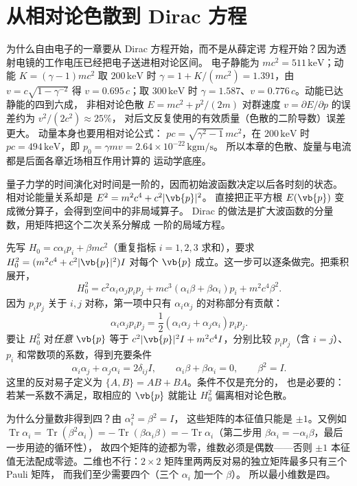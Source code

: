 \section{从相对论色散到 Dirac 方程}
\label{sec:feqo-dirac-from-dispersion}

为什么自由电子的一章要从 Dirac 方程开始，而不是从薛定谔
方程开始？因为透射电镜的工作电压已经把电子送进相对论区间。
电子静能为 \(mc^2=511\,\si{\kilo\electronvolt}\)；动能
\(K=(\gamma-1)mc^2\) 取 \(200\,\si{\kilo\electronvolt}\) 时
\(\gamma=1+K/(mc^2)=1.391\)，由 \(v=c\sqrt{1-\gamma^{-2}}\)
得 \(v=0.695\,c\)；取 \(300\,\si{\kilo\electronvolt}\) 时
\(\gamma=1.587\)、\(v=0.776\,c\)。动能已达静能的四到六成，
非相对论色散 \(E=mc^2+p^2/(2m)\) 对群速度
\(v=\partial E/\partial p\) 的误差约为 \(v^2/(2c^2)\approx25\%\)，
对后文反复使用的有效质量（色散的二阶导数）误差更大。
动量本身也要用相对论公式：
\(pc=\sqrt{\gamma^2-1}\,mc^2\)，在 \(200\,\si{\kilo\electronvolt}\)
时 \(pc=494\,\si{\kilo\electronvolt}\)，即
\(p_0=\gamma mv=2.64\times10^{-22}\,\si{\kilo\gram\metre\per\second}\)。
所以本章的色散、旋量与电流都是后面各章近场相互作用计算的
运动学底座。

量子力学的时间演化对时间是一阶的，因而初始波函数决定以后各时刻的状态。
相对论能量关系却是 \(E^2=m^2c^4+c^2|\vb{p}|^2\)。
直接把正平方根 \(E(\vb{p})\) 变成微分算子，会得到空间中的非局域算子。
Dirac 的做法是扩大波函数的分量数，用矩阵把这个二次关系分解成
一阶的局域方程。

先写 \(H_0=c\alpha_i p_i+\beta mc^2\)（重复指标 \(i=1,2,3\) 求和），要求
\(H_0^2=(m^2c^4+c^2|\vb{p}|^2)I\) 对每个 \(\vb{p}\)
成立。这一步可以逐条做完。把乘积展开，
\[
H_0^2=c^2\alpha_i\alpha_jp_ip_j
+mc^3(\alpha_i\beta+\beta\alpha_i)p_i+m^2c^4\beta^2 .
\]
因为 \(p_ip_j\) 关于 \(i,j\) 对称，第一项中只有 \(\alpha_i\alpha_j\)
的对称部分有贡献：
\[
\alpha_i\alpha_jp_ip_j
=\frac12(\alpha_i\alpha_j+\alpha_j\alpha_i)p_ip_j .
\]
要让 \(H_0^2\) 对\emph{任意} \(\vb{p}\) 等于
\(c^2|\vb{p}|^2I+m^2c^4I\)，分别比较 \(p_ip_j\)（含 \(i=j\)）、
\(p_i\) 和常数项的系数，得到充要条件
\begin{equation}
\alpha_i\alpha_j+\alpha_j\alpha_i=2\delta_{ij}I,\qquad
\alpha_i\beta+\beta\alpha_i=0,\qquad \beta^2=I.
\label{eq:feqo-dirac-anticommutators}
\end{equation}
这里的反对易子定义为 \(\{A,B\}=AB+BA\)。条件不仅是充分的，
也是必要的：若某一系数不满足，取相应的 \(\vb{p}\)
就能让 \(H_0^2\) 偏离相对论色散。

为什么分量数非得到四？由 \(\alpha_i^2=\beta^2=I\)，
这些矩阵的本征值只能是 \(\pm1\)。又例如
\(\operatorname{Tr}\alpha_i
=\operatorname{Tr}(\beta^2\alpha_i)
=-\operatorname{Tr}(\beta\alpha_i\beta)
=-\operatorname{Tr}\alpha_i\)（第二步用
\(\beta\alpha_i=-\alpha_i\beta\)，最后一步用迹的循环性），
故四个矩阵的迹都为零，维数必须是偶数——否则
\(\pm1\) 本征值无法配成零迹。二维也不行：\(2\times2\)
矩阵里两两反对易的独立矩阵最多只有三个 Pauli 矩阵，
而我们至少需要四个（三个 \(\alpha_i\) 加一个 \(\beta\)）。
所以最小维数是四。

